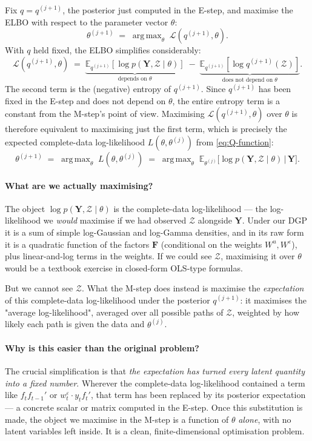 \documentclass[11pt, a4paper, oneside]{article}
\DeclareMathOperator*{\argmax}{arg\,max}
\newcommand{\mY}{\mathbf{Y}}
\newcommand{\mF}{\mathbf{F}}
\begin{document}
Fix $q = q^{(j+1)}$, the posterior just computed in the E-step, and
maximise the ELBO with respect to the parameter vector $\theta$:
\[
\theta^{(j+1)} \;=\; \argmax_\theta\;\mathcal{L}(q^{(j+1)}, \theta).
\]
With $q$ held fixed, the ELBO simplifies considerably:
\[
\mathcal{L}(q^{(j+1)}, \theta)
\;=\; \underbrace{\mathbb{E}_{q^{(j+1)}}[\log p(\mY, \mathcal{Z} \mid \theta)]}_{\text{depends on } \theta}
\;-\; \underbrace{\mathbb{E}_{q^{(j+1)}}[\log q^{(j+1)}(\mathcal{Z})]}_{\text{does not depend on } \theta}.
\]
The second term is the (negative) entropy of $q^{(j+1)}$. Since
$q^{(j+1)}$ has been fixed in the E-step and does not depend on
$\theta$, the entire entropy term is a constant from the M-step's point
of view. Maximising $\mathcal{L}(q^{(j+1)}, \theta)$ over $\theta$ is
therefore equivalent to maximising just the first term, which is
precisely the expected complete-data log-likelihood $L(\theta,
\theta^{(j)})$ from \eqref{eq:Q-function}:
\begin{equation}
\boxed{\;\;\theta^{(j+1)} \;=\; \argmax_\theta\; L(\theta, \theta^{(j)})
\;=\; \argmax_\theta\; \mathbb{E}_{\theta^{(j)}}\!\big[\log p(\mY, \mathcal{Z} \mid \theta) \,\big|\, \mY\big].\;\;}
\label{eq:m-step-formulation}
\end{equation}

\paragraph{What are we actually maximising?}
The object $\log p(\mY, \mathcal{Z} \mid \theta)$ is the complete-data
log-likelihood — the log-likelihood we \emph{would} maximise if we had
observed $\mathcal{Z}$ alongside $\mY$. Under our DGP it is a sum of
simple log-Gaussian and log-Gamma densities, and in its raw form it is a
quadratic function of the factors $\mF$ (conditional on the weights
$W^u, W^\varepsilon$), plus linear-and-log terms in the weights. If we
could see $\mathcal{Z}$, maximising it over $\theta$ would be a
textbook exercise in closed-form OLS-type formulas.

But we cannot see $\mathcal{Z}$. What the M-step does instead is
maximise the \emph{expectation} of this complete-data log-likelihood
under the posterior $q^{(j+1)}$: it maximises the "average
log-likelihood", averaged over all possible paths of $\mathcal{Z}$,
weighted by how likely each path is given the data and $\theta^{(j)}$.

\paragraph{Why is this easier than the original problem?}
The crucial simplification is that \emph{the expectation has turned every
latent quantity into a fixed number}. Wherever the complete-data
log-likelihood contained a term like $f_t f_{t-1}'$ or
$w^\varepsilon_t \cdot y_t f_t'$, that term has been replaced by its
posterior expectation — a concrete scalar or matrix computed in the
E-step. Once this substitution is made, the object we maximise in the
M-step is a function of $\theta$ \emph{alone}, with no latent variables
left inside. It is a clean, finite-dimensional optimisation problem.
\end{document}

